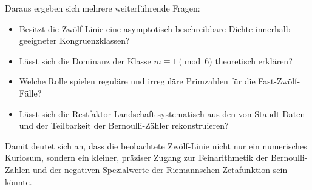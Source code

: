 \documentclass[11pt,a4paper]{article}
\theoremstyle{definition}
\theoremstyle{plain}
\theoremstyle{remark}
\begin{document}
Daraus ergeben sich mehrere weiterführende Fragen:
\begin{itemize}
\item Besitzt die Zwölf-Linie eine asymptotisch beschreibbare Dichte innerhalb geeigneter Kongruenzklassen?
\item Lässt sich die Dominanz der Klasse $m\equiv 1\pmod 6$ theoretisch erklären?
\item Welche Rolle spielen reguläre und irreguläre Primzahlen für die Fast-Zwölf-Fälle?
\item Lässt sich die Restfaktor-Landschaft systematisch aus den von-Staudt-Daten und der Teilbarkeit der Bernoulli-Zähler rekonstruieren?
\end{itemize}

Damit deutet sich an, dass die beobachtete Zwölf-Linie nicht nur ein numerisches Kuriosum, sondern ein kleiner, präziser Zugang zur Feinarithmetik der Bernoulli-Zahlen und der negativen Spezialwerte der Riemannschen Zetafunktion sein könnte.
\end{document}
